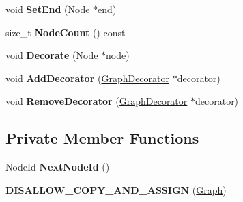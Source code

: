\begin{DoxyCompactItemize}
\item 
void {\bfseries Set\+End} (\hyperlink{classv8_1_1internal_1_1compiler_1_1_node}{Node} $\ast$end)\hypertarget{classv8_1_1internal_1_1compiler_1_1_graph_abf4f6bd1ac98bfc7b4c990e447dd7c0e}{}\label{classv8_1_1internal_1_1compiler_1_1_graph_abf4f6bd1ac98bfc7b4c990e447dd7c0e}

\item 
size\+\_\+t {\bfseries Node\+Count} () const \hypertarget{classv8_1_1internal_1_1compiler_1_1_graph_a36382a381b1efa158e4386e684e9ad27}{}\label{classv8_1_1internal_1_1compiler_1_1_graph_a36382a381b1efa158e4386e684e9ad27}

\item 
void {\bfseries Decorate} (\hyperlink{classv8_1_1internal_1_1compiler_1_1_node}{Node} $\ast$node)\hypertarget{classv8_1_1internal_1_1compiler_1_1_graph_adf3e16c3995f7c84eea268fc57600728}{}\label{classv8_1_1internal_1_1compiler_1_1_graph_adf3e16c3995f7c84eea268fc57600728}

\item 
void {\bfseries Add\+Decorator} (\hyperlink{classv8_1_1internal_1_1compiler_1_1_graph_decorator}{Graph\+Decorator} $\ast$decorator)\hypertarget{classv8_1_1internal_1_1compiler_1_1_graph_a13ed3a399ca31c0f237c803641a7bd19}{}\label{classv8_1_1internal_1_1compiler_1_1_graph_a13ed3a399ca31c0f237c803641a7bd19}

\item 
void {\bfseries Remove\+Decorator} (\hyperlink{classv8_1_1internal_1_1compiler_1_1_graph_decorator}{Graph\+Decorator} $\ast$decorator)\hypertarget{classv8_1_1internal_1_1compiler_1_1_graph_a11044dc7e34340de4b83105a47817e7b}{}\label{classv8_1_1internal_1_1compiler_1_1_graph_a11044dc7e34340de4b83105a47817e7b}

\end{DoxyCompactItemize}
\subsection*{Private Member Functions}
\begin{DoxyCompactItemize}
\item 
Node\+Id {\bfseries Next\+Node\+Id} ()\hypertarget{classv8_1_1internal_1_1compiler_1_1_graph_a43db3fa3f9187cbcd8e3e519351284f1}{}\label{classv8_1_1internal_1_1compiler_1_1_graph_a43db3fa3f9187cbcd8e3e519351284f1}

\item 
{\bfseries D\+I\+S\+A\+L\+L\+O\+W\+\_\+\+C\+O\+P\+Y\+\_\+\+A\+N\+D\+\_\+\+A\+S\+S\+I\+GN} (\hyperlink{classv8_1_1internal_1_1compiler_1_1_graph}{Graph})\hypertarget{classv8_1_1internal_1_1compiler_1_1_graph_a586da75baad564ce83360b9a5f033cee}{}\label{classv8_1_1internal_1_1compiler_1_1_graph_a586da75baad564ce83360b9a5f033cee}

\end{DoxyCompactItemize}

